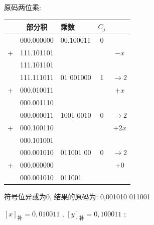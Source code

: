 \documentclass[UTF8]{report}
\newcommand{\ra}{\rightarrow}
\newcommand{\cdclass}[2]{[#1]_{\text{#2}}}
\newenvironment{solution}{{\noindent\hskip 2em \bf 解 \quad}}{}
\begin{document}
\begin{solution}
\begin{enumerate}
        原码两位乘:
        \begin{tabular}{cc|l|c|c}
             & 部分积      & 乘数      & $C_j$ & \\
            \hline
             & 000.000000 & 00.100011 & 0 & \\
            +& 111.101101 &           &   & $-x $ \\
            \hline
             & 111.101101 &           &   & \\
             & 111.111011 & 01 001000 & 1 & $\ra 2$ \\
            +& 000.010011 &           &   & $+x $ \\
            \hline
             & 000.001110 &           &   & \\
             & 000.000011 & 1001 0010 & 0 & $\ra 2$ \\
            +& 000.100110 &           &   & $+2x $ \\
            \hline
             & 000.101001 &           &   & \\
             & 000.001010 & 011001 00 & 0 & $\ra 2$ \\
            +& 000.000000 &           &   & $+0 $ \\
            \hline
             & 000.001010 & 011001    &   & \\
        \end{tabular}

        符号位异或为0, 结果的原码为: 0,001010 011001
        
        $\cdclass{x}{补}=  0,010011$ ,  $\cdclass{y}{补}= 0,100011$ ;


\end{enumerate}
\end{solution}
\end{document}
